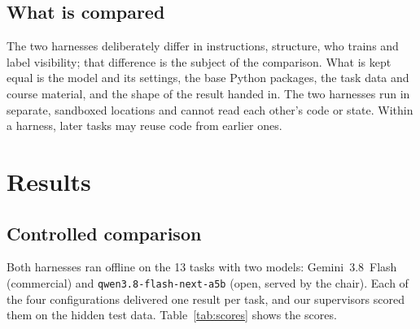 \documentclass[letterpaper,twocolumn,10pt]{article}
\begin{document}
\subsection{What is compared}

The two harnesses deliberately differ in instructions, structure, who trains and
label visibility; that difference is the subject of the comparison. What is
kept equal is the model and its settings, the base Python packages, the task
data and course material, and the shape of the result handed in. The two
harnesses run in separate, sandboxed locations and cannot read each other's
code or state. Within a harness, later tasks may reuse code from earlier ones.

\section{Results}
\label{sec:results}

\subsection{Controlled comparison}

Both harnesses ran offline on the 13 tasks with two models: Gemini~3.8~Flash
(commercial) and \texttt{qwen3.8-flash-next-a5b} (open, served by the
chair). Each of the four configurations delivered one result per task, and
our supervisors scored them on the hidden test data.
Table~\ref{tab:scores} shows the scores.
\end{document}
